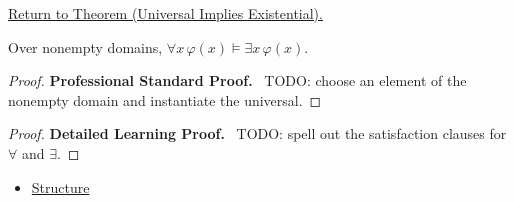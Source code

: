 \newpage
{}
\label{prf:universal-implies-existential}

\begin{remark*}[Return]
\hyperref[thm:universal-implies-existential]{Return to Theorem (Universal Implies Existential).}
\end{remark*}

\begin{theorem*}
Over nonempty domains, \(\forall x\,\varphi(x)\models \exists x\,\varphi(x)\).
\end{theorem*}

\begin{proof}
\textbf{Professional Standard Proof.}~
TODO: choose an element of the nonempty domain and instantiate the universal.
\end{proof}

\begin{proof}
\textbf{Detailed Learning Proof.}~
TODO: spell out the satisfaction clauses for \(\forall\) and \(\exists\).
\end{proof}

\begin{remark*}
\end{remark*}

\begin{dependencies}
\begin{itemize}
  \item \hyperref[def:structure]{Structure}
\end{itemize}
\end{dependencies}

\clearpage
